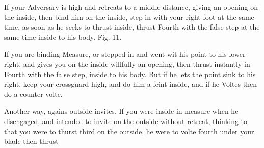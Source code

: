 
If your Adversary is high and retreats to a middle distance, giving an
opening on the inside, then bind him on the inside, step in with your
right foot at the same time, as soon as he seeks to thrust inside,
thrust Fourth with the false step at the same time inside to his
body. Fig. 11.

\exercise {}

If you are binding Measure, or stepped in and went wit his point to
his lower right, and gives you on the inside willfully an opening,
then thrust instantly in Fourth with the false step, inside to his
body. But if he lets the point sink to his right, keep your crossguard
high, and do him a feint inside, and if he Voltes then do a
counter-volte.

\exercise {}


Another way, agains outside invites. If you were inside in measure
when he disengaged, and intended to invite on the outside without
retreat, thinking to that you were to thurst third on the outside, he
were to volte fourth under your blade then thrust
